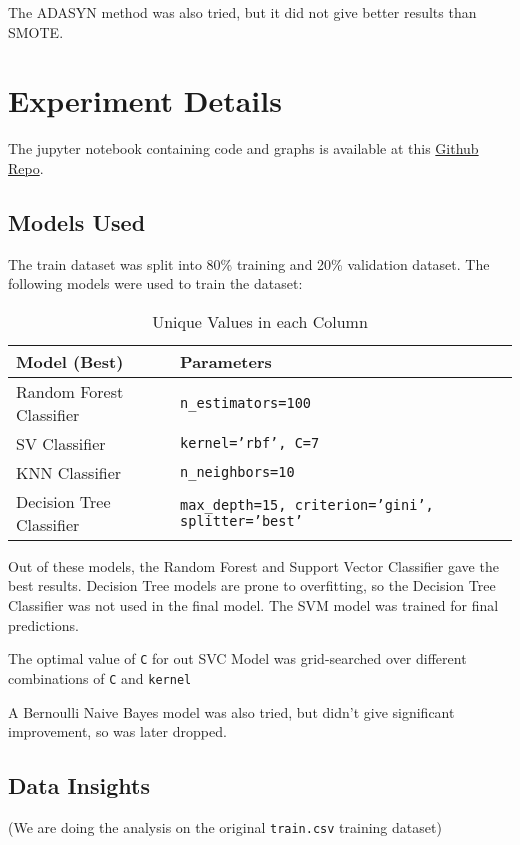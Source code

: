 \documentclass{article}
\begin{document}
The ADASYN \cite{4633969} method was also tried, but it did not give better results than SMOTE.

\section{Experiment Details}

The jupyter notebook containing code and graphs is available
at this \href{https://github.com/npqr/CS253-Assignments/blob/main/Assignment_3/witrw_220757_PatheNevishAshok.ipynb}{Github Repo}.

\subsection{Models Used}

The train dataset was split into 80\% training and 20\% validation dataset.
The following models were used to train the dataset:

\begin{table}[H]
    \centering
    \begin{tabular}{| l | l |}
        \hline
        \textbf{Model (Best)} & \textbf{Parameters} \\ 
        \hline
        Random Forest Classifier & \texttt{n\_estimators=100} \\
        SV Classifier           & \texttt{kernel='rbf', C=7} \\
        KNN Classifier          & \texttt{n\_neighbors=10} \\
        Decision Tree Classifier & \texttt{max\_depth=15, criterion='gini', splitter='best'} \\
        \hline
    \end{tabular}
    \caption{Unique Values in each Column}
    \label{tab:unique_values}
\end{table}

Out of these models, the Random Forest and Support Vector Classifier gave the best results.
Decision Tree models are prone to overfitting, so the Decision Tree Classifier was not used in the final model.
The SVM model was trained for final predictions.

The optimal value of \texttt{C} for out SVC Model was grid-searched over different combinations of
\texttt{C} and \texttt{kernel}

A Bernoulli Naive Bayes model was also tried, but didn't give significant improvement, so was later dropped.

\subsection{Data Insights}
(We are doing the analysis on the original \texttt{train.csv} training dataset)
\end{document}
